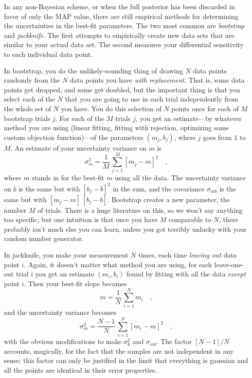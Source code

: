 \documentclass[12pt,twoside]{article}
\begin{document}
In any non-Bayesian scheme, or when the full posterior has been
discarded in favor of only the MAP value, there are still empirical
methods for determining the uncertainties in the best-fit parameters.
The two most common are \emph{bootstrap} and \emph{jackknife}.  The
first attempts to empirically create new data sets that are similar to
your actual data set.  The second measures your differential
sensitivity to each individual data point.

In bootstrap, you do the unlikely-sounding thing of drawing $N$ data
points randomly from the $N$ data points you have \emph{with
  replacement}.  That is, some data points get dropped, and some get
doubled, but the important thing is that you select each of the $N$
that you are going to use in each trial independently from the whole
set of $N$ you have.  You do this selection of $N$ points once for
each of $M$ bootstrap trials $j$.  For each of the $M$ trials $j$, you
get an estimate---by whatever method you are using (linear fitting,
fitting with rejection, optimizing some custom objection
function)---of the parameters $(m_j,b_j)$, where $j$ goes from $1$ to
$M$.  An estimate of your uncertainty variance on $m$ is
\begin{equation}
\sigma_m^2 = \frac{1}{M}\,\sum_{j=1}^M [m_j-m]^2 \quad ,
\end{equation}
where $m$ stands in for the best-fit $m$ using all the data.  The
uncertainty variance on $b$ is the same but with $[b_j-b]^2$ in the
sum, and the covariance $\sigma_{mb}$ is the same but with
$[m_j-m]\,[b_j-b]$.  Bootstrap creates a new parameter, the number $M$
of trials.  There is a huge literature on this, so we won't say
anything too specific, but one intuition is that once you have $M$
comparable to $N$, there probably isn't much else you can learn,
unless you got terribly unlucky with your random number generator.

In jackknife, you make your measurement $N$ times, each time
\emph{leaving out} data point $i$.  Again, it doesn't matter what
method you are using, for each leave-one-out trial $i$ you get an
estimate $(m_i,b_i)$ found by fitting with all the data \emph{except}
point $i$.  Then your best-fit slope becomes
\begin{equation}
m = \frac{1}{N}\,\sum_{i=1}^N m_i \quad ,
\end{equation}
and the uncertainty variance becomes
\begin{equation}
\sigma_m^2 = \frac{N-1}{N}\,\sum_{i=1}^N [m_i-m]^2 \quad ,
\end{equation}
with the obvious modifications to make $\sigma_b^2$ and $\sigma_{mb}$.
The factor $[N-1]/N$ accounts, magically, for the fact that the
samples are not independent in any sense; this factor can only be
justified in the limit that everything is gaussian and all the points
are identical in their error properties.
\end{document}
